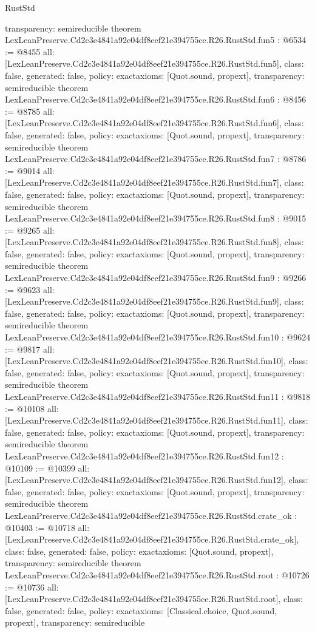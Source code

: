 \begin{lexlean}{RustStd}
\begin{coremodule}
{  transparency: semireducible
}
theorem LexLeanPreserve.Cd2c3e4841a92e04df8eef21e394755ce.R26.RustStd.fun5 : @6534 := @8455 {
  all: [LexLeanPreserve.Cd2c3e4841a92e04df8eef21e394755ce.R26.RustStd.fun5],
  class: false,
  generated: false,
  policy: exact{axioms: [Quot.sound, propext]},
  transparency: semireducible
}
theorem LexLeanPreserve.Cd2c3e4841a92e04df8eef21e394755ce.R26.RustStd.fun6 : @8456 := @8785 {
  all: [LexLeanPreserve.Cd2c3e4841a92e04df8eef21e394755ce.R26.RustStd.fun6],
  class: false,
  generated: false,
  policy: exact{axioms: [Quot.sound, propext]},
  transparency: semireducible
}
theorem LexLeanPreserve.Cd2c3e4841a92e04df8eef21e394755ce.R26.RustStd.fun7 : @8786 := @9014 {
  all: [LexLeanPreserve.Cd2c3e4841a92e04df8eef21e394755ce.R26.RustStd.fun7],
  class: false,
  generated: false,
  policy: exact{axioms: [Quot.sound, propext]},
  transparency: semireducible
}
theorem LexLeanPreserve.Cd2c3e4841a92e04df8eef21e394755ce.R26.RustStd.fun8 : @9015 := @9265 {
  all: [LexLeanPreserve.Cd2c3e4841a92e04df8eef21e394755ce.R26.RustStd.fun8],
  class: false,
  generated: false,
  policy: exact{axioms: [Quot.sound, propext]},
  transparency: semireducible
}
theorem LexLeanPreserve.Cd2c3e4841a92e04df8eef21e394755ce.R26.RustStd.fun9 : @9266 := @9623 {
  all: [LexLeanPreserve.Cd2c3e4841a92e04df8eef21e394755ce.R26.RustStd.fun9],
  class: false,
  generated: false,
  policy: exact{axioms: [Quot.sound, propext]},
  transparency: semireducible
}
theorem LexLeanPreserve.Cd2c3e4841a92e04df8eef21e394755ce.R26.RustStd.fun10 : @9624 := @9817 {
  all: [LexLeanPreserve.Cd2c3e4841a92e04df8eef21e394755ce.R26.RustStd.fun10],
  class: false,
  generated: false,
  policy: exact{axioms: [Quot.sound, propext]},
  transparency: semireducible
}
theorem LexLeanPreserve.Cd2c3e4841a92e04df8eef21e394755ce.R26.RustStd.fun11 : @9818 := @10108 {
  all: [LexLeanPreserve.Cd2c3e4841a92e04df8eef21e394755ce.R26.RustStd.fun11],
  class: false,
  generated: false,
  policy: exact{axioms: [Quot.sound, propext]},
  transparency: semireducible
}
theorem LexLeanPreserve.Cd2c3e4841a92e04df8eef21e394755ce.R26.RustStd.fun12 : @10109 := @10399 {
  all: [LexLeanPreserve.Cd2c3e4841a92e04df8eef21e394755ce.R26.RustStd.fun12],
  class: false,
  generated: false,
  policy: exact{axioms: [Quot.sound, propext]},
  transparency: semireducible
}
theorem LexLeanPreserve.Cd2c3e4841a92e04df8eef21e394755ce.R26.RustStd.crate_ok : @10403 := @10718 {
  all: [LexLeanPreserve.Cd2c3e4841a92e04df8eef21e394755ce.R26.RustStd.crate_ok],
  class: false,
  generated: false,
  policy: exact{axioms: [Quot.sound, propext]},
  transparency: semireducible
}
theorem LexLeanPreserve.Cd2c3e4841a92e04df8eef21e394755ce.R26.RustStd.root : @10726 := @10736 {
  all: [LexLeanPreserve.Cd2c3e4841a92e04df8eef21e394755ce.R26.RustStd.root],
  class: false,
  generated: false,
  policy: exact{axioms: [Classical.choice, Quot.sound, propext]},
  transparency: semireducible
}


\end{coremodule}
\end{lexlean}
